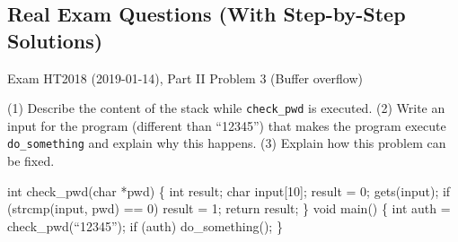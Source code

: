 \documentclass[12pt, a4paper]{article}
\begin{document}
\subsection*{Real Exam Questions (With Step-by-Step Solutions)}

\begin{practicebox}{Exam HT2018 (2019-01-14), Part II Problem 3 (Buffer overflow)}
\begin{problembox}
(1) Describe the content of the stack while \texttt{check\_pwd} is executed. (2) Write an input for the program (different than ``12345'') that makes the program execute \texttt{do\_something} and explain why this happens. (3) Explain how this problem can be fixed. 
\begin{codebox}
int check\_pwd(char *pwd) \{ int result;
char input[10];
result = 0;
gets(input);
if (strcmp(input, pwd) == 0) result = 1;
return result;
\} void main() \{ int auth = check\_pwd(``12345'');
if (auth) do\_something();
\}
\end{codebox}

\end{problembox}


\end{practicebox}
\end{document}
